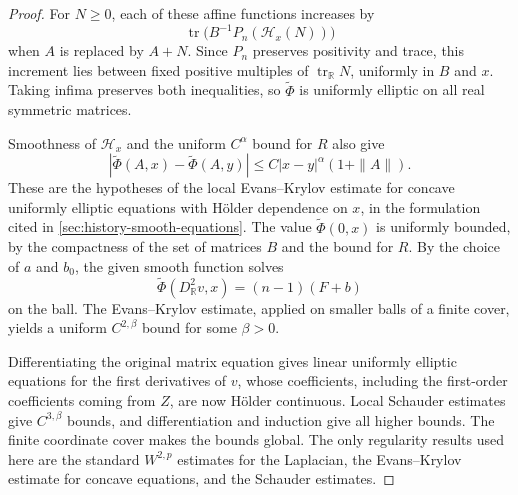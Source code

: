 \begin{proof}
For $N\geq0$, each of these affine functions increases by
\[
 \operatorname{tr}\bigl(B^{-1}P_n(\mathcal H_x(N))\bigr)
\]
when $A$ is replaced by $A+N$. Since $P_n$ preserves positivity and trace, this increment lies between fixed positive multiples of $\operatorname{tr}_{\mathbb R}N$, uniformly in $B$ and $x$. Taking infima preserves both inequalities, so $\widetilde\Phi$ is uniformly elliptic on all real symmetric matrices.

Smoothness of $\mathcal H_x$ and the uniform $C^\alpha$ bound for $R$ also give
\[
 |\widetilde\Phi(A,x)-\widetilde\Phi(A,y)|
          \leq C|x-y|^\alpha(1+\|A\|).
\]
These are the hypotheses of the local Evans--Krylov estimate for concave uniformly elliptic equations with H\"older dependence on $x$, in the formulation cited in \cref{sec:history-smooth-equations}. The value $\widetilde\Phi(0,x)$ is uniformly bounded, by the compactness of the set of matrices $B$ and the bound for $R$. By the choice of $a$ and $b_0$, the given smooth function solves
\[
 \widetilde\Phi(D^2_{\mathbb R}v,x)=(n-1)(F+b)
\]
on the ball. The Evans--Krylov estimate, applied on smaller balls of a finite cover, yields a uniform $C^{2,\beta}$ bound for some $\beta>0$.

Differentiating the original matrix equation gives linear uniformly elliptic equations for the first derivatives of $v$, whose coefficients, including the first-order coefficients coming from $Z$, are now H\"older continuous. Local Schauder estimates give $C^{3,\beta}$ bounds, and differentiation and induction give all higher bounds. The finite coordinate cover makes the bounds global. The only regularity results used here are the standard $W^{2,p}$ estimates for the Laplacian, the Evans--Krylov estimate for concave equations, and the Schauder estimates.
\end{proof}

